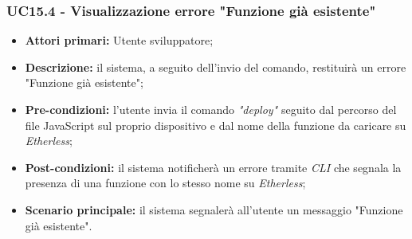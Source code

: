 \subsubsection{UC15.4 - Visualizzazione errore "Funzione già esistente"}
\begin{itemize}
	\item \textbf{Attori primari:} Utente sviluppatore;
	\item \textbf{Descrizione:} il sistema, a seguito dell'invio del comando, restituirà un errore "Funzione già esistente";
	\item \textbf{Pre-condizioni:}  l'utente invia il comando \textit{"deploy\glos"} seguito dal percorso del file JavaScript sul proprio dispositivo e dal nome della funzione da caricare su \textit{Etherless};
	\item \textbf{Post-condizioni:} il sistema notificherà un errore tramite \textit{CLI\glo} che segnala la presenza di una funzione con lo stesso nome su \textit{Etherless};
	\item \textbf{Scenario principale:} il sistema segnalerà all'utente un messaggio "Funzione già esistente".
\end{itemize}